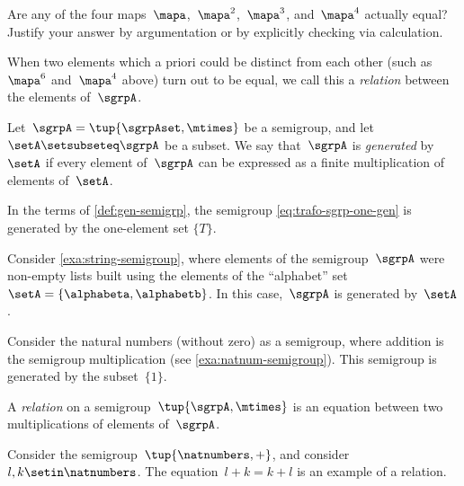 \begin{gradedexercise}
    \label{ex:CheckRelations}
    Are any of the four maps~$\mapa$,~$\mapa^2$,~$\mapa^3$, and~$\mapa^4$ actually equal?
    Justify your answer by argumentation or by explicitly checking via calculation.
\end{gradedexercise}

When two elements which a priori could be distinct from each other (such as~$\mapa^6$ and~$\mapa^4$ above) turn out to be equal, we call this a \emph{relation} between the elements of~$\sgrpA$.

\begin{ctdefinition}
    \label{def:gen-semigrp}
    Let~$\sgrpA = \tup{\sgrpAset, \mtimes}$ be a semigroup, and let~$\setA \setsubseteq \sgrpA$ be a subset.
    We say that~$\sgrpA$ is \emph{generated} by~$\setA$ if every element of~$\sgrpA$ can be expressed as a finite multiplication of elements of~$\setA$.
\end{ctdefinition}

\begin{remark}
    In the terms of \cref{def:gen-semigrp}, the semigroup \cref{eq:trafo-sgrp-one-gen} is generated by the one-element set $\{ T \}$.
\end{remark}

\begin{example}
    Consider \cref{exa:string-semigroup}, where elements of the semigroup~$\sgrpA$ were non-empty lists built using the elements of the ``alphabet'' set~$\setA = \{ \alphabeta, \alphabetb\}$.
    In this case,~$\sgrpA$ is generated by~$\setA$.
\end{example}

\begin{example}
    Consider the natural numbers (without zero) as a semigroup, where addition is the semigroup multiplication (see \cref{exa:natnum-semigroup}).
    This semigroup is generated by the subset~$\{1 \}$.
\end{example}

\begin{ctdefinition}
    A \emph{relation} on a semigroup~$\tup{\sgrpA, \mtimes}$ is an equation between two multiplications of elements of~$\sgrpA$.
\end{ctdefinition}

\begin{example}
    Consider the semigroup~$\tup{\natnumbers, +}$, and consider~$l, k \setin \natnumbers$.
    The equation~$l + k = k + l$ is an example of a relation.
\end{example}

